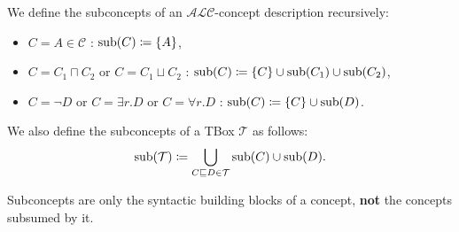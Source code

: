 \begin{mdframed}[frametitle={Subconcepts in $\mathcal{ALC}$}]
	We define the subconcepts of an $\mathcal{ALC}$-concept description recursively:
	\begin{itemize}
		\item $C = A \in \mathscr{C}$ : $\operatorname{\text{sub}}(C) \coloneqq \left\{ A \right\}$,
		\item $C = C_1 \sqcap C_2$ or $C = C_1 \sqcup C_2$ : $\operatorname{\text{sub}}(C) \coloneqq \left\{ C \right\} \cup \operatorname{\text{sub}}(C_1) \cup \operatorname{\text{sub}}(C_2)$,
		\item $C = \neg D$ or $C = \exists r.D$ or $C = \forall r.D$ : $\operatorname{\text{sub}}(C) \coloneqq \left\{ C \right\} \cup \operatorname{\text{sub}}(D)$.
	\end{itemize}
	We also define the subconcepts of a TBox $\mathcal{T}$ as follows:
	\[
		\func{sub}(\mathcal{T}) \coloneqq \bigcup_{C \sqsubseteq D \in \mathcal{T}} \func{sub}(C) \cup \func{sub}(D)
	.\]
\end{mdframed}
\begin{note}
	Subconcepts are only the syntactic building blocks of a concept, \textbf{not} the concepts subsumed by it.
\end{note}
